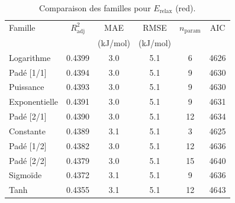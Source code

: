 \begin{table}[htbp]
\centering
\footnotesize
\caption{Comparaison des familles pour $E_{\mathrm{relax}}$ (red).}
\label{tab:s4_erelax_red_families}
\begin{tabular}{lccccc}
\toprule
Famille & $R^2_{\mathrm{adj}}$ & MAE & RMSE & $n_{\mathrm{param}}$ & AIC \\
 & & (kJ/mol) & (kJ/mol) & & \\
\midrule
Logarithme & 0.4399 & 3.0 & 5.1 & 6 & 4626 \\
Padé [1/1] & 0.4394 & 3.0 & 5.1 & 9 & 4630 \\
Puissance & 0.4393 & 3.0 & 5.1 & 9 & 4630 \\
Exponentielle & 0.4391 & 3.0 & 5.1 & 9 & 4631 \\
Padé [2/1] & 0.4390 & 3.0 & 5.1 & 12 & 4634 \\
Constante & 0.4389 & 3.1 & 5.1 & 3 & 4625 \\
Padé [1/2] & 0.4382 & 3.0 & 5.1 & 12 & 4636 \\
Padé [2/2] & 0.4379 & 3.0 & 5.1 & 15 & 4640 \\
Sigmoïde & 0.4372 & 3.1 & 5.1 & 9 & 4636 \\
Tanh & 0.4355 & 3.1 & 5.1 & 12 & 4643 \\
\bottomrule
\end{tabular}
\end{table}